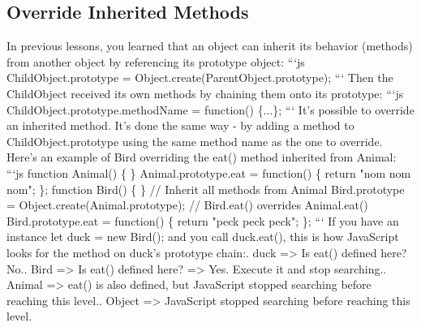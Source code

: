 \documentclass{article}%
\begin{document}
\subsection{Override Inherited Methods}%
\label{subsec:OverrideInheritedMethods}%
In previous lessons, you learned that an object can inherit its behavior (methods) from another object by referencing its prototype object:\newline%
```js\newline%
ChildObject.prototype = Object.create(ParentObject.prototype);\newline%
```\newline%
Then the ChildObject received its own methods by chaining them onto its prototype:\newline%
```js\newline%
ChildObject.prototype.methodName = function() \{...\};\newline%
```\newline%
It's possible to override an inherited method. It's done the same way {-} by adding a method to ChildObject.prototype using the same method name as the one to override.\newline%
Here's an example of Bird overriding the eat() method inherited from Animal:\newline%
```js\newline%
function Animal() \{ \}\newline%
Animal.prototype.eat = function() \{\newline%
  return "nom nom nom";\newline%
\};\newline%
function Bird() \{ \}\newline%
// Inherit all methods from Animal\newline%
Bird.prototype = Object.create(Animal.prototype);\newline%
// Bird.eat() overrides Animal.eat()\newline%
Bird.prototype.eat = function() \{\newline%
  return "peck peck peck";\newline%
\};\newline%
```\newline%
If you have an instance let duck = new Bird(); and you call duck.eat(), this is how JavaScript looks for the method on duck’s prototype chain:. duck => Is eat() defined here? No.. Bird => Is eat() defined here? => Yes. Execute it and stop searching.. Animal => eat() is also defined, but JavaScript stopped searching before reaching this level.. Object => JavaScript stopped searching before reaching this level.\newline%
\end{document}
